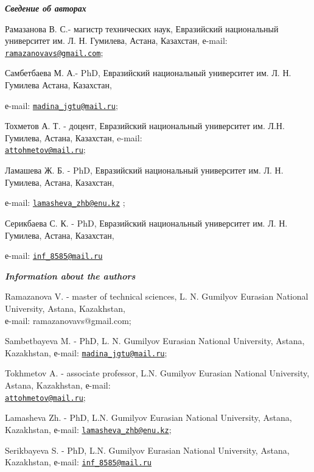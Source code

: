 \begin{authorinfo}
\hspace{1em}\emph{{\bfseries Сведение об авторах}}

Рамазанова В. С.- магистр технических наук, Евразийский национальный
университет им. Л. Н. Гумилева, Астана, Казахстан, е-mail:
\href{mailto:ramazanovavs@gmail.com}{\nolinkurl{ramazanovavs@gmail.com}};

Самбетбаева М. А.- PhD, Евразийский национальный университет им. Л. Н.
Гумилева Астана, Казахстан,

е-mail:
\href{mailto:madina_jgtu@mail.ru}{\nolinkurl{madina\_jgtu@mail.ru}};

Тохметов А. Т. - доцент, Евразийский национальный университет им. Л.Н.
Гумилева, Астана, Казахстан, e-mail:\\
\href{mailto:attohmetov@mail.ru}{\nolinkurl{attohmetov@mail.ru}};

Ламашева Ж. Б. - PhD, Евразийский национальный университет им. Л. Н.
Гумилева, Астана, Казахстан,

е-mail:
\href{mailto:lamasheva_zhb@enu.kz}{\nolinkurl{lamasheva\_zhb@enu.kz}} ;

Серикбаева С. К. - PhD, Евразийский национальный университет им. Л. Н.
Гумилева, Астана, Казахстан,

е-mail: \href{mailto:inf_8585@mail.ru}{\nolinkurl{inf\_8585@mail.ru}}

\hspace{1em}\emph{{\bfseries Information about the authors}}

Ramazanova V. - master of technical sciences, L. N. Gumilyov Eurasian
National University, Astana, Kazakhstan, \\е-mail: ramazanovavs@gmail.com;

Sambetbayeva M. - PhD, L. N. Gumilyov Eurasian National University,
Astana, Kazakhstan, е-mail:
\href{mailto:madina_jgtu@mail.ru}{\nolinkurl{madina\_jgtu@mail.ru}};

Tokhmetov A. - associate professor, L.N. Gumilyov Eurasian National
University, Astana, Kazakhstan, е-mail:
\\\href{mailto:attohmetov@mail.ru}{\nolinkurl{attohmetov@mail.ru}};

Lamasheva Zh. - PhD, L.N. Gumilyov Eurasian National University, Astana,
Kazakhstan, е-mail:
\href{mailto:lamasheva_zhb@enu.kz}{\nolinkurl{lamasheva\_zhb@enu.kz}};

Serikbayeva S. - PhD, L.N. Gumilyov Eurasian National University,
Astana, Kazakhstan, е-mail:
\href{mailto:inf_8585@mail.ru}{\nolinkurl{inf\_8585@mail.ru}}
\end{authorinfo}
